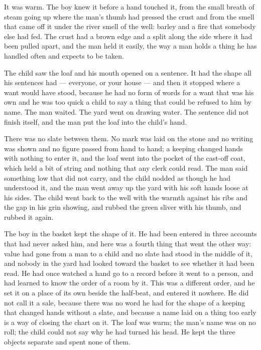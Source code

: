 It was warm. The boy knew it before a hand touched it, from the small breath of steam going up where the man's thumb had pressed the crust and from the smell that came off it under the river smell of the well: barley and a fire that somebody else had fed. The crust had a brown edge and a split along the side where it had been pulled apart, and the man held it easily, the way a man holds a thing he has handled often and expects to be taken.

The child saw the loaf and his mouth opened on a sentence. It had the shape all his sentences had --- everyone, or your house --- and then it stopped where a want would have stood, because he had no form of words for a want that was his own and he was too quick a child to say a thing that could be refused to him by name. The man waited. The yard went on drawing water. The sentence did not finish itself, and the man put the loaf into the child's hand.

There was no slate between them. No mark was laid on the stone and no writing was shown and no figure passed from hand to hand; a keeping changed hands with nothing to enter it, and the loaf went into the pocket of the cast-off coat, which held a bit of string and nothing that any clerk could read. The man said something low that did not carry, and the child nodded as though he had understood it, and the man went away up the yard with his soft hands loose at his sides. The child went back to the well with the warmth against his ribs and the gap in his grin showing, and rubbed the green sliver with his thumb, and rubbed it again.

The boy in the basket kept the shape of it. He had been entered in three accounts that had never asked him, and here was a fourth thing that went the other way: value had gone from a man to a child and no slate had stood in the middle of it, and nobody in the yard had looked toward the basket to see whether it had been read. He had once watched a hand go to a record before it went to a person, and had learned to know the order of a room by it. This was a different order, and he set it on a place of its own beside the half-beat, and entered it nowhere. He did not call it a sale, because there was no  word he had for the shape of a keeping that changed hands without a slate, and because a name laid on a thing too early is a way of closing the chart on it. The loaf was warm; the man's name was on no roll; the child could not say why he had turned his head. He kept the three objects separate and spent none of them.

